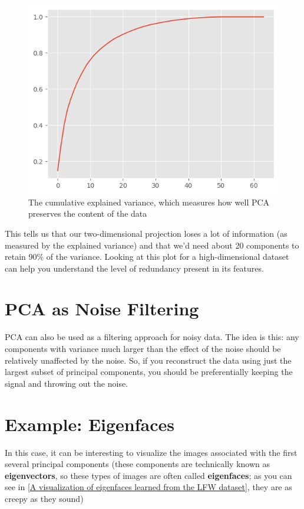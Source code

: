 \begin{figure}
    \centering
    \includegraphics{../Figures/fig45-8.png}
    \caption{The cumulative explained variance, which measures how well PCA preserves the content of the data}
\end{figure}

This tells us that our two-dimensional projection loses a lot of information (as measured by the explained variance) and that we'd need about 20 components to retain
90\% of the variance. Looking at this plot for a high-dimensional dataset can help you
understand the level of redundancy present in its features.

\section{PCA as Noise Filtering}
PCA can also be used as a filtering approach for noisy data. The idea is this: any components with variance much larger than the effect of the noise should be relatively unaffected by the noise. So, if you reconstruct the data using just the largest subset of principal components, you should be preferentially keeping the signal and throwing out the noise.

\section{Example: Eigenfaces}
In this case, it can be interesting to visualize the images associated with the first several principal components (these components are technically known as \textbf{eigenvectors}, so these types of images are often called \textbf{eigenfaces}; as you can see in \autoref{A visualization of eigenfaces learned from the LFW dataset}, they are as creepy as they sound)


